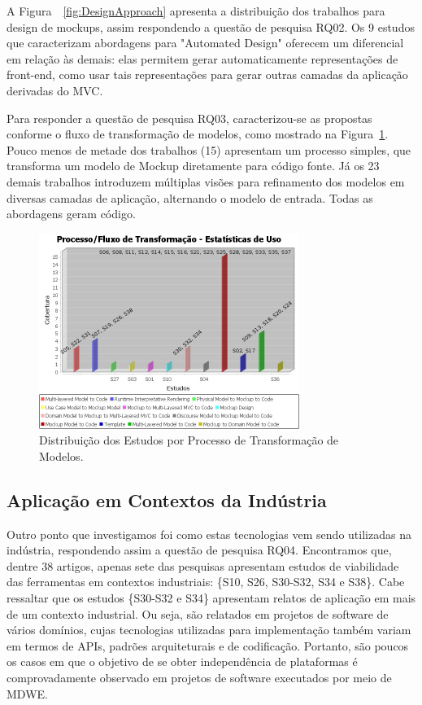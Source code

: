 A Figura~~\ref{fig:DesignApproach} apresenta a distribuição dos trabalhos para design de mockups, assim respondendo a questão de pesquisa RQ02. Os 9 estudos que caracterizam abordagens para "Automated Design" oferecem um diferencial em relação às demais: elas permitem gerar automaticamente representações de front-end, como usar tais representações para gerar outras camadas da aplicação derivadas do MVC.

Para responder a questão de pesquisa RQ03, caracterizou-se as propostas conforme o fluxo de transformação de modelos, como mostrado na Figura~\ref{fig:RefinementFlow}. Pouco menos de metade dos trabalhos (15) apresentam um processo simples, que transforma um modelo de Mockup diretamente para código fonte. Já os 23 demais trabalhos introduzem múltiplas visões para refinamento dos modelos em diversas camadas de aplicação, alternando o modelo de entrada. Todas as abordagens geram código.  





\begin{figure}[t!]
    \centering
    \includegraphics[width=240pt]{./imgs/RefinementFlow.jpeg}
    \caption{Distribuição dos Estudos por Processo de Transformação de Modelos.}
    \label{fig:RefinementFlow}
\end{figure}
 
\subsection{Aplicação em Contextos da Indústria}

Outro ponto que investigamos foi como estas tecnologias vem sendo utilizadas na indústria, respondendo assim a questão de pesquisa RQ04. Encontramos que, dentre 38 artigos, apenas sete das pesquisas apresentam estudos de viabilidade das ferramentas em contextos industriais: \{S10, S26, S30-S32, S34 e S38\}. Cabe ressaltar que os estudos \{S30-S32 e S34\} apresentam relatos de aplicação em mais de um contexto industrial. Ou seja, são relatados em projetos de software de vários domínios, cujas tecnologias utilizadas para implementação também variam em termos de APIs, padrões arquiteturais e de codificação. Portanto, são poucos os casos em que o objetivo de se obter independência de plataformas é comprovadamente observado em projetos de software executados por meio de MDWE.

